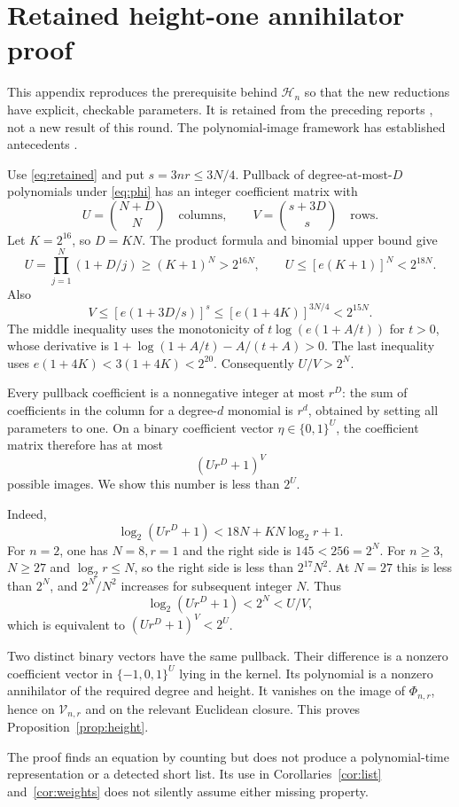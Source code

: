 \documentclass[11pt]{article}
\theoremstyle{definition}
\theoremstyle{remark}
\newcommand{\Var}{\mathcal V}
\newcommand{\Witness}{\mathcal H}
\begin{document}
\appendix
\section{Retained height-one annihilator proof}\label{sec:height}

This appendix reproduces the prerequisite behind $\Witness_n$ so that the new reductions have explicit, checkable parameters. It is retained from the preceding reports \cite{round3}, not a new result of this round. The polynomial-image framework has established antecedents \cite{kumarvolk}.

Use \eqref{eq:retained} and put $s=3nr\le3N/4$. Pullback of degree-at-most-$D$ polynomials under \eqref{eq:phi} has an integer coefficient matrix with
\[
 U=\binom{N+D}{N}\quad\text{columns},\qquad
 V=\binom{s+3D}{s}\quad\text{rows}.
\]
Let $K=2^{16}$, so $D=KN$. The product formula and binomial upper bound give
\[
 U=\prod_{j=1}^N(1+D/j)\ge(K+1)^N>2^{16N},
 \qquad U\le[e(K+1)]^N<2^{18N}.
\]
Also
\[
 V\le[e(1+3D/s)]^s\le[e(1+4K)]^{3N/4}<2^{15N}.
\]
The middle inequality uses the monotonicity of $t\log(e(1+A/t))$ for $t>0$, whose derivative is $1+\log(1+A/t)-A/(t+A)>0$. The last inequality uses $e(1+4K)<3(1+4K)<2^{20}$. Consequently $U/V>2^N$.

Every pullback coefficient is a nonnegative integer at most $r^D$: the sum of coefficients in the column for a degree-$d$ monomial is $r^d$, obtained by setting all parameters to one. On a binary coefficient vector $\eta\in\{0,1\}^U$, the coefficient matrix therefore has at most
\[
 (Ur^D+1)^V
\]
possible images. We show this number is less than $2^U$.

Indeed,
\[
 \log_2(Ur^D+1)<18N+KN\log_2r+1.
\]
For $n=2$, one has $N=8,r=1$ and the right side is $145<256=2^N$. For $n\ge3$, $N\ge27$ and $\log_2r\le N$, so the right side is less than $2^{17}N^2$. At $N=27$ this is less than $2^N$, and $2^N/N^2$ increases for subsequent integer $N$. Thus
\[
 \log_2(Ur^D+1)<2^N<U/V,
\]
which is equivalent to $(Ur^D+1)^V<2^U$.

Two distinct binary vectors have the same pullback. Their difference is a nonzero coefficient vector in $\{-1,0,1\}^U$ lying in the kernel. Its polynomial is a nonzero annihilator of the required degree and height. It vanishes on the image of $\Phi_{n,r}$, hence on $\Var_{n,r}$ and on the relevant Euclidean closure. This proves Proposition~\ref{prop:height}.

The proof finds an equation by counting but does not produce a polynomial-time representation or a detected short list. Its use in Corollaries~\ref{cor:list} and~\ref{cor:weights} does not silently assume either missing property.
\end{document}
